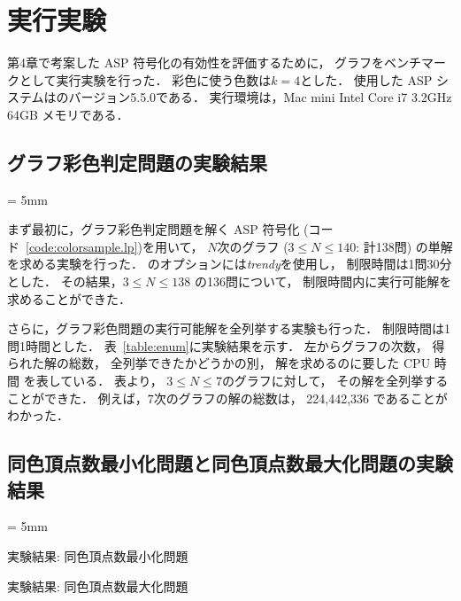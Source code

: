 \chapter{実行実験}\label{chap:experiments}

第4章で考案した ASP 符号化の有効性を評価するために，
グラフをベンチマークとして実行実験を行った．
彩色に使う色数は$k=4$とした．
使用した ASP システムは{\clingo}のバージョン5.5.0である．
実行環境は，Mac mini Intel Core i7 3.2GHz 64GB メモリである．

\section{グラフ彩色判定問題の実験結果}

\begin{table}[ht]
  \centering
  \tabcolsep = 5mm
  \renewcommand{\arraystretch}{1.1}
\end{table}

まず最初に，グラフ彩色判定問題を解く ASP 符号化
(コード~\ref{code:colorsample.lp})を用いて，
$N$次のグラフ ($3 \leq N\leq 140$: 計138問)
の単解を求める実験を行った．
{\clingo}のオプションには\textit{trendy}を使用し，
制限時間は1問30分とした．
その結果，$3 \leq N\leq 138$ の136問について，
制限時間内に実行可能解を求めることができた．

さらに，グラフ彩色問題の実行可能解を全列挙する実験も行った．
制限時間は1問1時間とした．
表~\ref{table:enum}に実験結果を示す．
左からグラフの次数，
得られた解の総数，
全列挙できたかどうかの別，
解を求めるのに要した CPU 時間
を表している．
表より，
$3 \leq N\leq 7$のグラフに対して，
その解を全列挙することができた．
例えば，$7$次のグラフの解の総数は，
224,442,336 であることがわかった．

\section{同色頂点数最小化問題と同色頂点数最大化問題の実験結果}

\begin{table}[htp]
  \tabcolsep = 5mm
  \begin{minipage}[t]{0.45\linewidth}
    \centering
    \caption{実験結果: 同色頂点数最小化問題}
    \label{table:min}
  \end{minipage}
  \begin{minipage}[t]{0.45\linewidth}
    \centering
    \caption{実験結果: 同色頂点数最大化問題}
    \label{table:max}
  \end{minipage}
\end{table}

